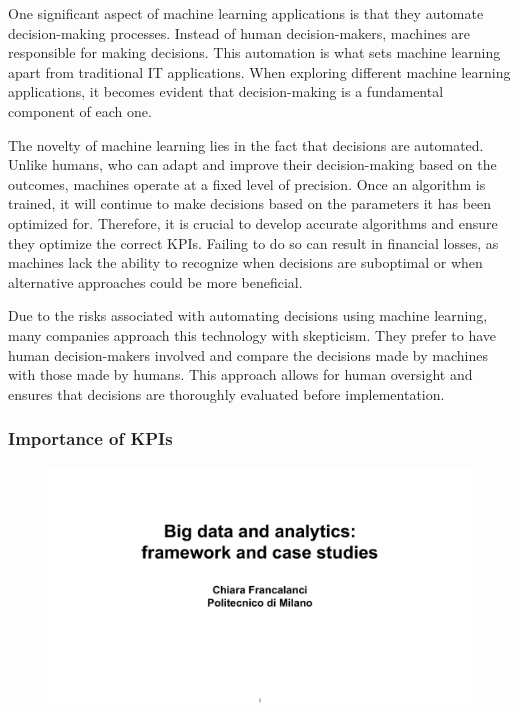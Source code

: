 One significant aspect of machine learning applications is that they
automate decision-making processes. Instead of human decision-makers,
machines are responsible for making decisions. This automation is what
sets machine learning apart from traditional IT applications. When
exploring different machine learning applications, it becomes evident
that decision-making is a fundamental component of each one.

The novelty of machine learning lies in the fact that decisions are
automated. Unlike humans, who can adapt and improve their
decision-making based on the outcomes, machines operate at a fixed level
of precision. Once an algorithm is trained, it will continue to make
decisions based on the parameters it has been optimized for. Therefore,
it is crucial to develop accurate algorithms and ensure they optimize
the correct KPIs. Failing to do so can result in financial losses, as
machines lack the ability to recognize when decisions are suboptimal or
when alternative approaches could be more beneficial.

Due to the risks associated with automating decisions using machine
learning, many companies approach this technology with skepticism. They
prefer to have human decision-makers involved and compare the decisions
made by machines with those made by humans. This approach allows for
human oversight and ensures that decisions are thoroughly evaluated
before implementation.

\subsubsection{Importance of KPIs}

\begin{figure}[!h]
  \centering
  \includegraphics[page=20, trim = 3cm 2.5cm 4cm 2.9cm, clip, width=\imagewidth]{images/06 - BIG_DATA.pdf}
\end{figure}

